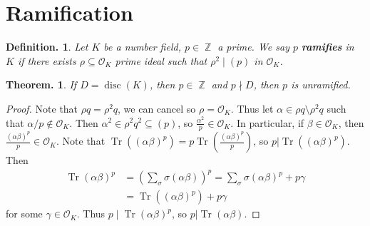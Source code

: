 \documentclass[11pt, a4paper]{memoir}
\DeclareMathOperator{\Z}{{\mathbb{Z}}}
\theoremstyle{change}
\newtheorem{theorem}{Theorem.}[section]
\theoremstyle{plain}
\theoremstyle{nonumberplain}
\newtheorem{definition}{Definition.}
\newtheorem{proof}{Proof}
\DeclareMathOperator{\disc}{disc}
\DeclareMathOperator{\Tr}{Tr}
\numberwithin{equation}{section}
\begin{document}
\section{Ramification}
\begin{definition}
    Let $K$ be a number field, $p\in\Z$ a prime.
    We say $p$ \textbf{ramifies} in $K$ if there exists $\rho\subseteq\mathcal{O}_K$ prime ideal such that $\rho^2\mid(p)$ in $\mathcal{O}_K$.
\end{definition}
\begin{theorem}
    If $D=\disc(K)$, then $p\in\Z$ and $p\nmid D$, then $p$ is unramified.
\end{theorem}
\begin{proof}
    Note that $\rho q=\rho^2q$, we can cancel so $\rho=\mathcal{O}_K$.
    Thus let $\alpha\in\rho q\setminus\rho^2 q$ such that $\alpha/p\notin\mathcal{O}_K$.
    Then $\alpha^2\in\rho^2 q^2\subseteq(p)$, so $\frac{\alpha^2}{p}\in\mathcal{O}_K$.
    In particular, if $\beta\in\mathcal{O}_K$, then $\frac{(\alpha\beta)^p}{p}\in\mathcal{O}_K$.
    Note that $\Tr((\alpha\beta)^p)=p\Tr\left(\frac{(\alpha\beta)^p}{p}\right)$, so $p|\Tr((\alpha\beta)^p)$.
    Then
    \begin{align*}
        \Tr(\alpha\beta)^p &=\left(\sum_\sigma\sigma(\alpha\beta)\right)^p=\sum_\sigma\sigma(\alpha\beta)^p+p\gamma\\
                           &= \Tr((\alpha\beta)^p)+p\gamma
    \end{align*}
    for some $\gamma\in\mathcal{O}_K$.
    Thus $p\mid\Tr(\alpha\beta)^p$, so $p|\Tr(\alpha\beta)$.


\end{proof}
\end{document}
